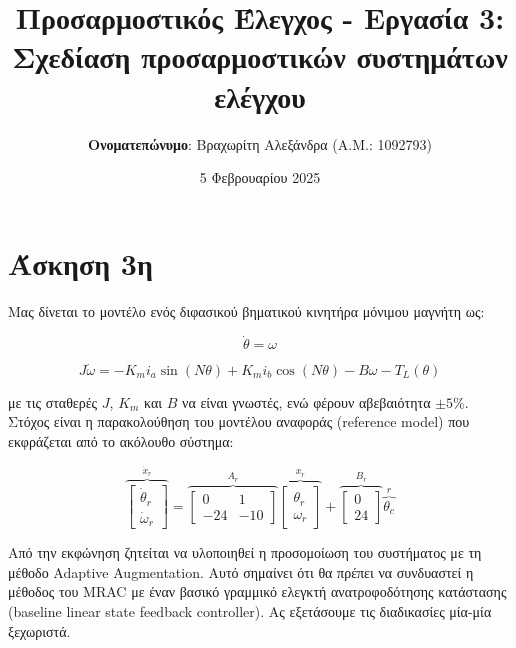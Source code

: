 \documentclass{article}
\title{\textbf{Προσαρμοστικός Έλεγχος - Εργασία 3: Σχεδίαση προσαρμοστικών συστημάτων ελέγχου}}
\author{\textbf{Ονοματεπώνυμο}: Βραχωρίτη Αλεξάνδρα (A.M.: 1092793)}
\date{5 Φεβρουαρίου 2025}
\begin{document}
    \maketitle
    \section{Άσκηση 3η}
    Μας δίνεται το μοντέλο ενός διφασικού βηματικού κινητήρα μόνιμου μαγνήτη ως:
    
    \begin{equation*}
        \dot{\theta} = \omega
    \end{equation*}
    
    \begin{equation*}
        J\dot{\omega} = -K_m i_a \sin(N \theta) + K_m i_b \cos(N \theta) - B \omega - T_L(\theta)
    \end{equation*}
    
    \hfill\break
    με τις σταθερές \(J\), \(K_m\) και \(B\) να είναι γνωστές, ενώ φέρουν αβεβαιότητα \(\pm 5 \%\). Στόχος είναι η παρακολούθηση του μοντέλου αναφοράς (reference model) που εκφράζεται από το ακόλουθο σύστημα:
    
    \begin{equation}
        \overbrace{\begin{bmatrix}
            \dot{\theta}_r \\
            \dot{\omega}_r
        \end{bmatrix}}^{\dot{x}_r} =
        \overbrace{
        \begin{bmatrix}
              0 &   1 \\
            -24 & -10
        \end{bmatrix}}^{A_r}
        \overbrace{
        \begin{bmatrix}
            \theta_r \\
            \omega_r
        \end{bmatrix}}^{x_r} +
        \overbrace{
        \begin{bmatrix}
             0 \\ 
            24
        \end{bmatrix}}^{B_r} \overbrace{\theta_c}^{r}
    \end{equation}
    
    \hfill\break
    Από την εκφώνηση ζητείται να υλοποιηθεί η προσομοίωση του συστήματος με τη μέθοδο Adaptive Augmentation. Αυτό σημαίνει ότι θα πρέπει να συνδυαστεί η μέθοδος του MRAC με έναν βασικό γραμμικό ελεγκτή ανατροφοδότησης κατάστασης (baseline linear state feedback controller). Ας εξετάσουμε τις διαδικασίες μία-μία ξεχωριστά.
    
\end{document}
